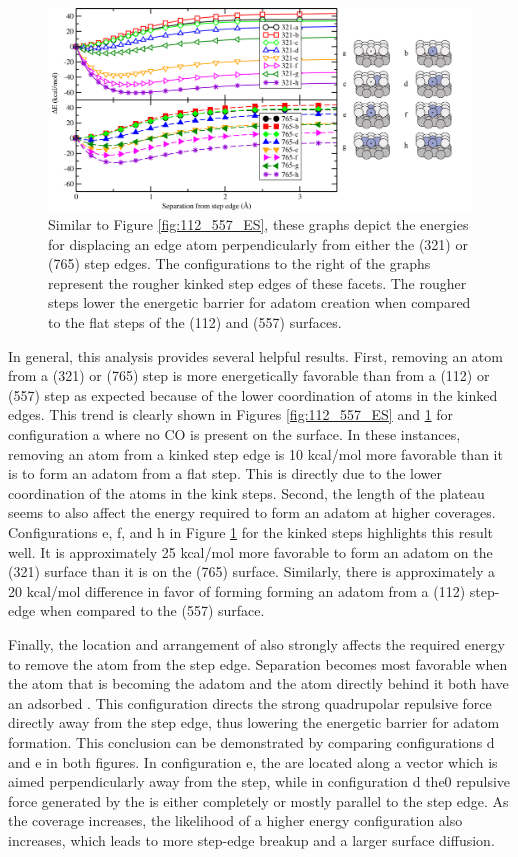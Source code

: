 \begin{landscape}
\begin{figure}[p!]
  \centering
  \includegraphics[width=0.75\linewidth]{../figures/chap4/321_765_EnergySeparation.pdf}
  \caption{Similar to Figure \ref{fig:112_557_ES}, these graphs depict the
energies for displacing an edge atom perpendicularly from either the (321) or
(765) step edges. The configurations to the right of the graphs represent the
rougher kinked step edges of these facets. The rougher steps lower the 
energetic barrier for adatom creation when compared to the flat steps of the
(112) and (557) surfaces.}
\label{fig:321_765_ES}
\end{figure}
\end{landscape}

In general, this analysis provides several helpful results. First, removing an
atom from a (321) or (765) step is more energetically favorable than from a
(112) or (557) step as expected because of the lower coordination of atoms in
the kinked edges. This trend is clearly shown in Figures \ref{fig:112_557_ES}
and \ref{fig:321_765_ES} for configuration a where no CO is present on the
surface. In these instances, removing an atom from a kinked step edge is 10
kcal/mol more favorable than it is to form an adatom from a flat step. This is
directly due to the lower coordination of the atoms in the kink steps.
Second, the length of the plateau seems to also affect the energy required to form
an adatom at higher coverages.  Configurations e, f, and h in Figure
\ref{fig:321_765_ES} for the kinked steps highlights this result well. It is
approximately 25 kcal/mol more favorable to form an adatom on the (321) surface
than it is on the (765) surface. Similarly, there is approximately a 20
kcal/mol difference in favor of forming  forming an adatom from a (112) step-edge when
compared to the (557) surface.

Finally, the location and arrangement of  also strongly affects the
required energy to remove the atom from the step edge. Separation becomes most
favorable when the atom that is becoming the adatom and the atom directly
behind it both have an adsorbed . This configuration directs the strong
quadrupolar repulsive force directly away from the step edge, thus lowering the
energetic barrier for adatom formation.  This conclusion can be demonstrated by
comparing configurations d and e in both figures. In configuration e, the
 are located along a vector which is aimed perpendicularly away from the
step, while in configuration d the0 repulsive force generated by the  is
either completely or mostly parallel to the step edge. As the coverage
increases, the likelihood of a higher energy configuration also increases,
which leads to more step-edge breakup and a larger surface diffusion.

